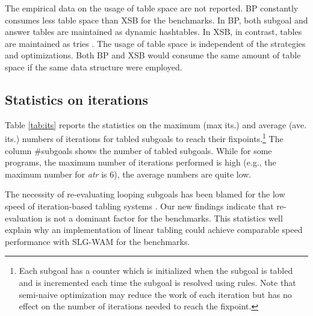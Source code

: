 \documentclass{tlp}
\begin{document}
The empirical data on the usage of table space are not reported. BP constantly consumes less table space than XSB for the benchmarks. In BP, both subgoal and answer tables are maintained as dynamic hashtables. In XSB, in contrast, tables are maintained as tries \cite{Ram98}. The usage of table space is independent of the strategies and optimizations. Both BP and XSB would consume the same amount of table space if the same data structure were employed.

\subsection{Statistics on iterations}
Table \ref{tab:its} reports the statistics on the maximum (max its.) and average (ave. its.) numbers of iterations for tabled subgoals to reach their fixpoints.\footnote{Each subgoal has a counter which is initialized when the subgoal is tabled and is incremented each time the subgoal is resolved using rules. Note that semi-naive optimization may reduce the work of each iteration but has no effect on the number of iterations needed to reach the fixpoint.} The column \#subgoals shows the number of tabled subgoals. While for some programs, the maximum number of iterations performed is high (e.g., the maximum number for {\it atr} is 6), the average numbers are quite low. 

The necessity of re-evaluating looping subgoals has been blamed for the low speed of iteration-based tabling systems \cite{Zhou00,Guo01}. Our new findings indicate that re-evaluation is not a dominant factor for the benchmarks. This statistics well explain why an implementation of linear tabling could achieve comparable speed performance with SLG-WAM for the benchmarks.
\end{document}
